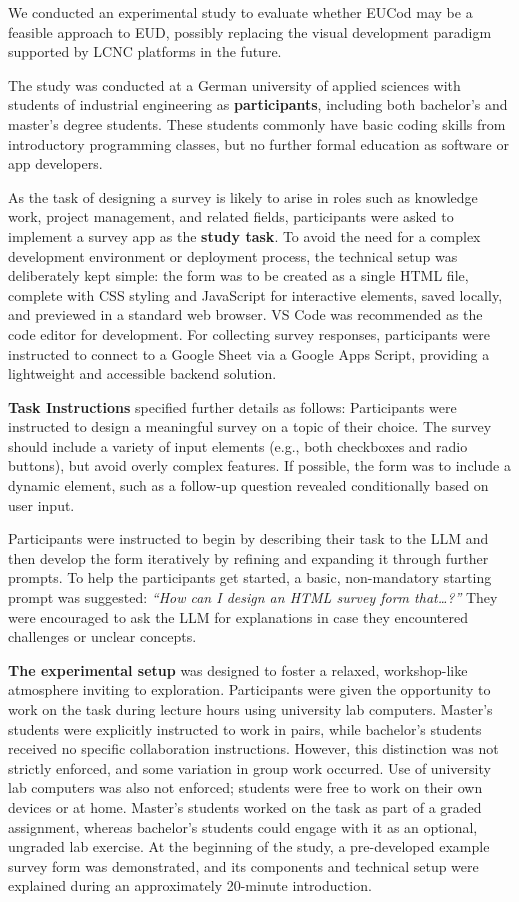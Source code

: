 \documentclass[english,anonymous]{lni}
\begin{document}
We conducted an experimental study to evaluate whether EUCod may be a feasible approach to EUD, possibly  replacing the visual development paradigm  supported by LCNC platforms in the future.

The study was conducted at a German university of applied sciences with  students of industrial engineering as  {\bf participants}, including both bachelor's and master's degree students. These students commonly have  basic coding skills from introductory programming classes, but  no further formal education as software or app developers.  

As the task of designing a survey  is likely to arise  in roles such as knowledge work, project management, and related fields, participants were asked to implement a survey app as the \textbf{study task}. To avoid the need for a complex development environment or deployment process, the technical setup was deliberately kept simple: the form was to be created as a single HTML file, complete with CSS styling and JavaScript for interactive elements, saved locally, and previewed in a standard web browser. VS Code was recommended as the code editor for development. For collecting survey responses, participants were instructed to connect to a Google Sheet  via a Google Apps Script, providing a lightweight and accessible backend solution.

{\bf Task Instructions} specified further details as follows:
Participants were instructed to design a meaningful survey on a topic of their choice. The survey should include a variety of input elements (e.g., both checkboxes and radio buttons), but avoid overly complex features. If possible, the form was to include a dynamic element,  such as a follow-up question revealed conditionally based on user input.

Participants were instructed to begin by describing their task to the LLM and then develop the form iteratively by refining and expanding it through further prompts. To help the participants  get started, a basic, non-mandatory starting prompt was suggested: \textit{``How can I design an HTML survey form that\ldots?''}
They were encouraged to ask the LLM for explanations in case they encountered challenges or unclear concepts.


{\bf The experimental setup} was designed  to foster a relaxed, workshop-like atmosphere inviting to exploration. 
Participants were given the opportunity to work on the task during lecture hours using university lab computers. Master’s students were explicitly instructed to work in pairs, while bachelor’s students received no specific collaboration instructions. However, this distinction was not strictly enforced, and some variation in group work occurred. Use of university lab computers was also not enforced; students were free to work on their own devices or at home. 
Master's students worked on the task as part of a graded assignment, whereas bachelor's students could engage with it as an optional, ungraded lab exercise. 
At the beginning of the study, a pre-developed example survey form was demonstrated, and its components and technical setup were explained during an approximately 20-minute introduction.
\end{document}
